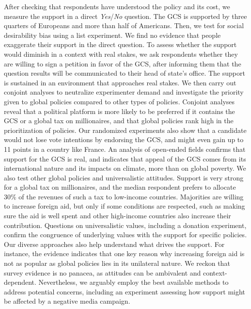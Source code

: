 After checking that respondents have understood the policy and its cost, we measure the support in a direct \textit{Yes}/\textit{No} question. The GCS is supported by three quarters of Europeans and more than half of Americans. Then, we test for social desirability bias using a list experiment. We find no evidence that people exaggerate their support in the direct question. To assess whether the support would diminish in a context with real stakes, we ask respondents whether they are willing to sign a petition in favor of the GCS, after informing them that the question results will be communicated to their head of state's office. The support is sustained in an environment that approaches real stakes. We then carry out conjoint analyses to neutralize experimenter demand and investigate the priority given to global policies compared to other types of policies. Conjoint analyses reveal that a political platform is more likely to be preferred if it contains the GCS or a global tax on millionaires, and that global policies rank high in the prioritization of policies. Our randomized experiments also show that a candidate would not lose vote intentions by endorsing the GCS, and might even gain up to 11 points in a country like France. An analysis of open-ended fields confirms that support for the GCS is real, and indicates that appeal of the GCS comes from its international nature and its impacts on climate, more than on global poverty. %
We also test other global policies and universalistic attitudes. Support is very strong for a global tax on millionaires, and the median respondent prefers to allocate 30\% of the revenues of such a tax to low-income countries. Majorities are willing to increase foreign aid, but only if some conditions are respected, such as making sure the aid is well spent and other high-income countries also increase their contribution. Questions on universalistic values, including a donation experiment, confirm the congruence of underlying values with the support for specific policies. Our diverse approaches also help understand what drives the support. For instance, the evidence indicates that one key reason why increasing foreign aid is not as popular as global policies lies in its unilateral nature. We reckon that survey evidence is no panacea, as attitudes can be ambivalent and context-dependent. Nevertheless, we arguably employ the best available methods to address potential concerns, including an experiment assessing how support might be affected by a negative media campaign. 

